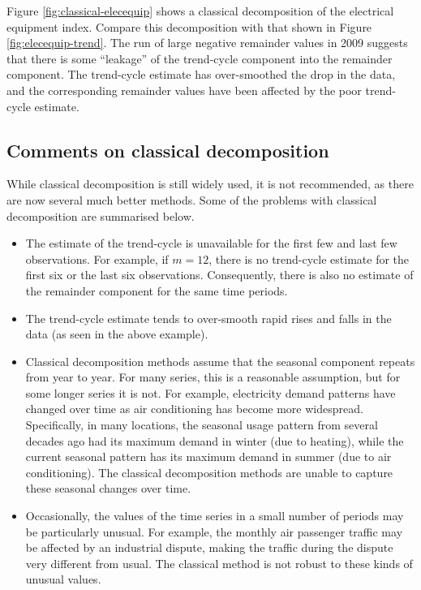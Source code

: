 \documentclass[]{book}
\begin{document}
Figure \ref{fig:classical-elecequip} shows a classical decomposition of the electrical equipment index. Compare this decomposition with that shown in Figure \ref{fig:elecequip-trend}. The run of large negative remainder values in 2009 suggests that there is some ``leakage'' of the trend-cycle component into the remainder component. The trend-cycle estimate has over-smoothed the drop in the data, and the corresponding remainder values have been affected by the poor trend-cycle estimate.

\hypertarget{comments-on-classical-decomposition}{%
\subsection*{Comments on classical decomposition}\label{comments-on-classical-decomposition}}

While classical decomposition is still widely used, it is not recommended, as there are now several much better methods. Some of the problems with classical decomposition are summarised below.

\begin{itemize}
\item
  The estimate of the trend-cycle is unavailable for the first few and last few observations. For example, if \(m=12\), there is no trend-cycle estimate for the first six or the last six observations. Consequently, there is also no estimate of the remainder component for the same time periods.
\item
  The trend-cycle estimate tends to over-smooth rapid rises and falls in the data (as seen in the above example).
\item
  Classical decomposition methods assume that the seasonal component repeats from year to year. For many series, this is a reasonable assumption, but for some longer series it is not. For example, electricity demand patterns have changed over time as air conditioning has become more widespread. Specifically, in many locations, the seasonal usage pattern from several decades ago had its maximum demand in winter (due to heating), while the current seasonal pattern has its maximum demand in summer (due to air conditioning). The classical decomposition methods are unable to capture these seasonal changes over time.
\item
  Occasionally, the values of the time series in a small number of periods may be particularly unusual. For example, the monthly air passenger traffic may be affected by an industrial dispute, making the traffic during the dispute very different from usual. The classical method is not robust to these kinds of unusual values.
\end{itemize}
\end{document}
